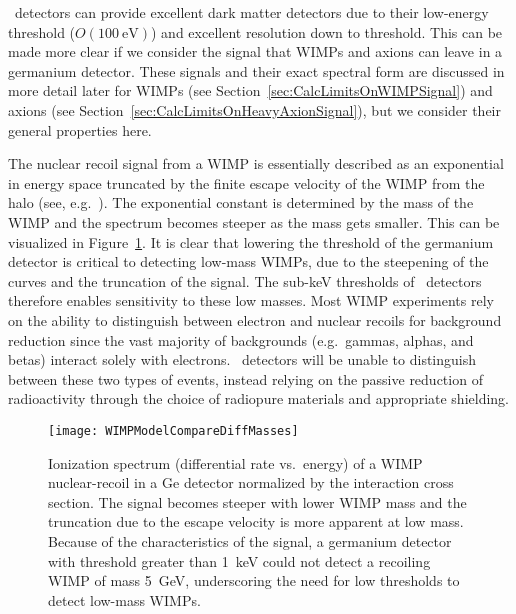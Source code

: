 	\ppc~detectors can provide excellent dark matter detectors due to their low-energy threshold ($O(100~\text{eV})$) and excellent resolution down to threshold.  This can be made more clear if we consider the signal that WIMPs and axions can leave in a germanium detector.  These signals and their exact spectral form are discussed in more detail later for WIMPs (see Section~\ref{sec:CalcLimitsOnWIMPSignal}) and axions (see Section~\ref{sec:CalcLimitsOnHeavyAxionSignal}), but we consider their general properties here.  
	
	The nuclear recoil signal from a WIMP is essentially described as an exponential in energy space truncated by the finite escape velocity of the WIMP from the halo (see, e.g.~\cite{Jun96, Lew96}).  The exponential constant is determined by the mass of the WIMP and the spectrum becomes steeper as the mass gets smaller.  This can be visualized in Figure~\ref{fig:WIMPDiffMasses}.  It is clear that lowering the threshold of the germanium detector is critical to detecting low-mass WIMPs, due to the steepening of the curves and the truncation of the signal.  The sub-keV thresholds of \ppc~detectors therefore enables sensitivity to these low masses.  Most WIMP experiments rely on the ability to distinguish between electron and nuclear recoils for background reduction since the vast majority of backgrounds (e.g.~gammas, alphas, and betas) interact solely with electrons.  \ppc~detectors will be unable to distinguish between these two types of events, instead relying on the passive reduction of radioactivity through the choice of radiopure materials and appropriate shielding.
	
			\begin{figure}
				\centering
				\texttt{[image: WIMPModelCompareDiffMasses]}
				\caption[Ionization spectrum of a WIMP nuclear-recoil in a Ge detector.]
				{Ionization spectrum (differential rate vs.~energy) of a WIMP nuclear-recoil in a Ge detector normalized by the
				 interaction cross section.  The signal becomes steeper with lower WIMP mass and the truncation due to the
				 escape velocity is more apparent at low mass.  Because of the characteristics of the signal, a germanium
				  detector with threshold greater than 1~keV could not detect a recoiling WIMP of mass 5~GeV, underscoring
				  the need for low thresholds to detect low-mass WIMPs.}
				\label{fig:WIMPDiffMasses}
			\end{figure}


